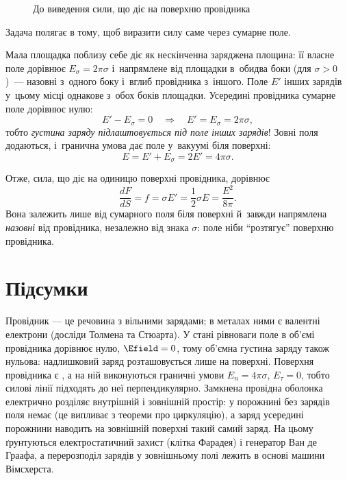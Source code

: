 \begin{figure}%
    \centering
    \caption{До виведення сили, що діє на поверхню провідника}
\end{figure}

Задача полягає в тому, щоб виразити силу саме через сумарне поле.

Мала площадка поблизу себе діє як нескінченна заряджена площина: її власне поле дорівнює
$E_\sigma = 2\pi\sigma$ і~напрямлене від площадки в~обидва боки (для $\sigma > 0$)~---
назовні з~одного боку і~вглиб провідника з~іншого. Поле $E'$ інших зарядів у~цьому місці
однакове з~обох боків площадки. Усередині провідника сумарне поле дорівнює нулю:
\begin{equation*}
    E' - E_{\sigma} = 0 \quad\Longrightarrow\quad E' = E_{\sigma} = 2\pi\sigma,
\end{equation*}
тобто \emph{густина заряду підлаштовується під поле інших зарядів}! Зовні поля
додаються, і~гранична умова дає поле у~вакуумі біля поверхні:
\begin{equation*}
    E = E' + E_{\sigma} = 2 E' = 4\pi\sigma.
\end{equation*}

Отже, сила, що діє на одиницю поверхні провідника, дорівнює
\begin{equation*}
    \frac{dF}{dS} = f = \sigma E' = \frac12 \sigma E = \frac{E^2}{8\pi}.
\end{equation*}
Вона залежить лише від сумарного поля біля поверхні й~завжди напрямлена \emph{назовні}
від провідника, незалежно від знака $\sigma$: поле ніби \enquote{розтягує} поверхню
провідника.


\section*{Підсумки}
{}

Провідник --- це речовина з вільними зарядами; в металах ними є  валентні електрони (досліди Толмена та Стюарта). У стані рівноваги поле в об'ємі провідника дорівнює нулю, $\Efield = 0$, тому об'ємна густина заряду також нульова: надлишковий заряд розташовується лише на поверхні. Поверхня провідника є , а на ній виконуються граничні умови $E_n = 4\pi\sigma$, $E_\tau = 0$, тобто силові лінії підходять до неї перпендикулярно. Замкнена провідна оболонка електрично розділяє внутрішній і зовнішній простір: у порожнині без зарядів поля немає (це випливає з теореми про циркуляцію), а заряд усередині порожнини наводить на зовнішній поверхні такий самий заряд. На цьому ґрунтуються електростатичний захист (клітка Фарадея) і генератор Ван де Граафа, а перерозподіл зарядів у зовнішньому полі лежить в основі машини Вімсхерста.

